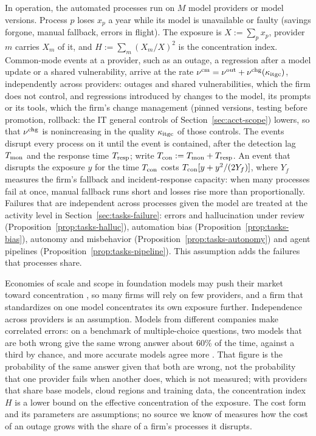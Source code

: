 \begin{assumption}\label{ass:ext-commonmode}
In operation, the automated processes run on $M$ model providers or model versions. Process $p$ loses $x_p$ a year while its model is unavailable or faulty (savings forgone, manual fallback, errors in flight). The exposure is $X:=\sum_px_p$, provider $m$ carries $X_m$ of it, and $H:=\sum_m(X_m/X)^2$ is the concentration index. Common-mode events at a provider, such as an outage, a regression after a model update or a shared vulnerability, arrive at the rate $\nu^{\rm cm}=\nu^{\rm out}+\nu^{\rm chg}(\kappa_{\rm itgc})$, independently across providers: outages and shared vulnerabilities, which the firm does not control, and regressions introduced by changes to the model, its prompts or its tools, which the firm's change management (pinned versions, testing before promotion, rollback: the IT general controls of Section~\ref{sec:acct-scope}) lowers, so that $\nu^{\rm chg}$ is nonincreasing in the quality $\kappa_{\rm itgc}$ of those controls. The events disrupt every process on it until the event is contained, after the detection lag $T_{\rm mon}$ and the response time $T_{\rm resp}$; write $T_{\rm con}:=T_{\rm mon}+T_{\rm resp}$. An event that disrupts the exposure $y$ for the time $T_{\rm con}$ costs $T_{\rm con}[y+y^2/(2Y_f)]$, where $Y_f$ measures the firm's fallback and incident-response capacity: when many processes fail at once, manual fallback runs short and losses rise more than proportionally. Failures that are independent across processes given the model are treated at the activity level in Section~\ref{sec:tasks-failure}: errors and hallucination under review (Proposition~\ref{prop:tasks-halluc}), automation bias (Proposition~\ref{prop:tasks-bias}), autonomy and misbehavior (Proposition~\ref{prop:tasks-autonomy}) and agent pipelines (Proposition~\ref{prop:tasks-pipeline}). This assumption adds the failures that processes share.
\end{assumption}

Economies of scale and scope in foundation models may push their market toward concentration \citep{korinek2025concentrating}, so many firms will rely on few providers, and a firm that standardizes on one model concentrates its own exposure further. Independence across providers is an assumption. Models from different companies make correlated errors: on a benchmark of multiple-choice questions, two models that are both wrong give the same wrong answer about 60\% of the time, against a third by chance, and more accurate models agree more \citep{kim2025correlated}. That figure is the probability of the same answer given that both are wrong, not the probability that one provider fails when another does, which is not measured; with providers that share base models, cloud regions and training data, the concentration index $H$ is a lower bound on the effective concentration of the exposure. The cost form and its parameters are assumptions; no source we know of measures how the cost of an outage grows with the share of a firm's processes it disrupts.

